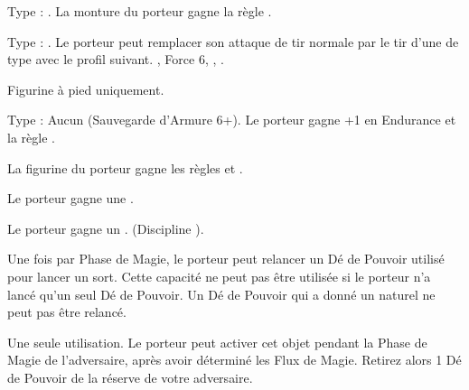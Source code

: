 Type : \lance{}. La monture du porteur gagne la règle .

Type : \shortbow{}. Le porteur peut remplacer son attaque de tir normale par le tir d'une \textbf{\artilleryweapon} de type \textbf{\boltthrower} avec le profil suivant.\newline
{}, Force 6, , .

\endpricelist

\armymagicalarmour

\startpricelist

Figurine à pied uniquement.

Type : Aucun (Sauvegarde d'Armure 6+). Le porteur gagne +1 en Endurance et la règle .

\endpricelist

\armytalismans

\startpricelist

La figurine du porteur gagne les règles \hardtarget{} et \fireborn{}.

\endpricelist

\armyenchanteditems

\startpricelist

Le porteur gagne une .

Le porteur gagne un . \whitemagicspellone{} (Discipline \whitemagic{}).

\endpricelist

\armyarcaneitems

\startpricelist

Une fois par Phase de Magie, le porteur peut relancer un Dé de Pouvoir utilisé pour lancer un sort. Cette capacité ne peut pas être utilisée si le porteur n'a lancé qu'un seul Dé de Pouvoir. Un Dé de Pouvoir qui a donné un  naturel ne peut pas être relancé.

Une seule utilisation. Le porteur peut activer cet objet pendant la Phase de Magie de l'adversaire, après avoir déterminé les Flux de Magie. Retirez alors 1 Dé de Pouvoir de la réserve de votre adversaire.

\endpricelist

\armymagicalbanners

